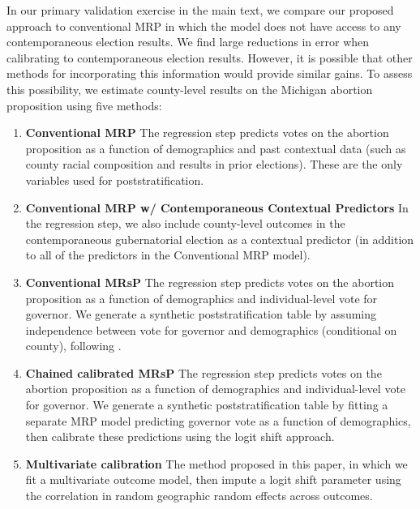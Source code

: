 In our primary validation exercise in the main text, we compare our proposed approach to conventional MRP in which the model does not have access to any contemporaneous election results. 
We find large reductions in error when calibrating to contemporaneous election results. 
However, it is possible that other methods for incorporating this information would provide similar gains. 
To assess this possibility, we estimate county-level results on the Michigan abortion proposition using five methods:
\begin{enumerate}
		\item \textbf{Conventional MRP} The regression step predicts votes on the abortion proposition as a function of demographics and past contextual data (such as county racial composition and results in prior elections). These are the only variables used for poststratification.
    \item \textbf{Conventional MRP w/ Contemporaneous Contextual Predictors} In the regression step, we also include county-level outcomes in the contemporaneous gubernatorial election as a contextual predictor (in addition to all of the predictors in the Conventional MRP model).
		\item \textbf{Conventional MRsP} The regression step predicts votes on the abortion proposition as a function of demographics and individual-level vote for governor. We generate a synthetic poststratification table by assuming independence between vote for governor and demographics (conditional on county), following \citet{LW:2017}.
		\item \textbf{Chained calibrated MRsP} The regression step predicts votes on the abortion proposition as a function of demographics and individual-level vote for governor. We generate a synthetic poststratification table by fitting a separate MRP model predicting governor vote as a function of demographics, then calibrate these predictions using the logit shift approach.
		\item \textbf{Multivariate calibration} The method proposed in this paper, in which we fit a multivariate outcome model, then impute a logit shift parameter using the correlation in random geographic random effects across outcomes. 
\end{enumerate}



\begin{table}[tbh]
		\centering
		\caption{County-Level Errors, 2022 Abortion Proposition in Michigan}
		\label{tab:compare_mrsp}
		
\end{table}

